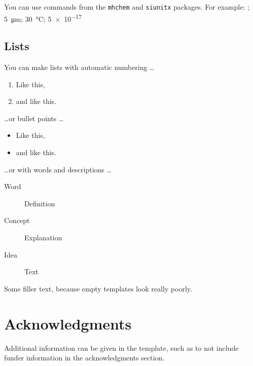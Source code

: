 \documentclass[9pt,lineno]{elife}
\begin{document}
You can use commands from the \texttt{mhchem} and \texttt{siunitx} packages. For example: ; \SI{5}{\micro\metre}; \SI{30}{\degreeCelsius}; \SI{5e-17}{\Molar}

\subsection{Lists}

You can make lists with automatic numbering \dots

\begin{enumerate}
\item Like this,
\item and like this.
\end{enumerate}
\dots or bullet points \dots
\begin{itemize} 
\item Like this,
\item and like this.
\end{itemize}
\dots or with words and descriptions \dots
\begin{description}
\item[Word] Definition
\item[Concept] Explanation
\item[Idea] Text
\end{description}

Some filler text, because empty templates look really poorly. \lipsum[1]


\section{Acknowledgments}

Additional information can be given in the template, such as to not include funder information in the acknowledgments section.

\nocite{*} %


\end{document}
